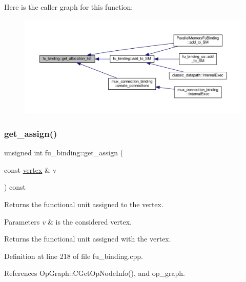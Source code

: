 Here is the caller graph for this function\+:
\nopagebreak
\begin{figure}[H]
\begin{center}
\leavevmode
\includegraphics[width=350pt]{d8/d04/classfu__binding_a833c4b4b6c6f4d52eec19e1de37ba514_icgraph}
\end{center}
\end{figure}
\mbox{\label{classfu__binding_af7ec91c33961d791fc2b977fd3b119bd}} 
\subsubsection{\texorpdfstring{get\+\_\+assign()}{get\_assign()}\hspace{0.1cm}{\footnotesize\ttfamily [1/2]}}
{\footnotesize\ttfamily unsigned int fu\+\_\+binding\+::get\+\_\+assign (\begin{DoxyParamCaption}\item[{const \hyperlink{graph_8hpp_abefdcf0544e601805af44eca032cca14}{vertex} \&}]{v }\end{DoxyParamCaption}) const}



Returns the functional unit assigned to the vertex. 


\begin{DoxyParams}{Parameters}
{\em v} & is the considered vertex. \\
\hline
\end{DoxyParams}
\begin{DoxyReturn}{Returns}
the functional unit assigned with the vertex. 
\end{DoxyReturn}


Definition at line 218 of file fu\+\_\+binding.\+cpp.



References Op\+Graph\+::\+C\+Get\+Op\+Node\+Info(), and op\+\_\+graph.



